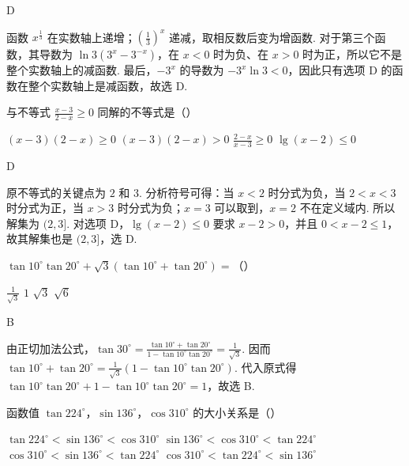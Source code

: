 \documentclass[UTF8,a4paper,oneside,11pt]{ctexbook}
\begin{document}
\begin{answer}
D
\end{answer}

\begin{solution}
函数 \(x^{\frac{1}{3}}\) 在实数轴上递增；\(\left(\frac13\right)^x\) 递减，取相反数后变为增函数. 对于第三个函数，其导数为 \(\ln3\left(3^x-3^{-x}\right)\)，在 \(x<0\) 时为负、在 \(x>0\) 时为正，所以它不是整个实数轴上的减函数. 最后，\(-3^x\) 的导数为 \(-3^x\ln3<0\)，因此只有选项 D 的函数在整个实数轴上是减函数，故选 D.
\end{solution}

\begin{problem}
与不等式 \(\frac{x - 3}{2 - x} \geqslant 0\) 同解的不等式是（\quad）

\choices
    {\((x - 3)(2 - x) \geqslant 0\)}
    {\((x - 3)(2 - x) > 0\)}
    {\(\frac{2 - x}{x - 3} \geqslant 0\)}
    {\(\lg(x - 2) \leqslant 0\)}
\end{problem}

\begin{answer}
D
\end{answer}

\begin{solution}
原不等式的关键点为 \(2\) 和 \(3\). 分析符号可得：当 \(x<2\) 时分式为负，当 \(2<x<3\) 时分式为正，当 \(x>3\) 时分式为负；\(x=3\) 可以取到，\(x=2\) 不在定义域内. 所以解集为 \((2,3]\). 对选项 D，\(\lg(x-2)\leqslant0\) 要求 \(x-2>0\)，并且 \(0<x-2\leqslant1\)，故其解集也是 \((2,3]\)，选 D.
\end{solution}

\begin{problem}
\(\tan 10^\circ \tan 20^\circ + \sqrt{3}\left(\tan 10^\circ + \tan 20^\circ\right) =\)（\quad）

\choices
    {\(\frac{1}{\sqrt{3}}\)}
    {\(1\)}
    {\(\sqrt{3}\)}
    {\(\sqrt{6}\)}
\end{problem}

\begin{answer}
B
\end{answer}

\begin{solution}
由正切加法公式，\(\tan30^\circ=\frac{\tan10^\circ+\tan20^\circ}{1-\tan10^\circ\tan20^\circ}=\frac1{\sqrt3}\). 因而 \(\tan10^\circ+\tan20^\circ=\frac1{\sqrt3}\left(1-\tan10^\circ\tan20^\circ\right)\). 代入原式得 \(\tan10^\circ\tan20^\circ+1-\tan10^\circ\tan20^\circ=1\)，故选 B.
\end{solution}

\begin{problem}
函数值 \(\tan 224^\circ\)，\(\sin 136^\circ\)，\(\cos 310^\circ\) 的大小关系是（\quad）

\choices
    {\(\tan 224^\circ < \sin 136^\circ < \cos 310^\circ\)}
    {\(\sin 136^\circ < \cos 310^\circ < \tan 224^\circ\)}
    {\(\cos 310^\circ < \sin 136^\circ < \tan 224^\circ\)}
    {\(\cos 310^\circ < \tan 224^\circ < \sin 136^\circ\)}
\end{problem}
\end{document}
